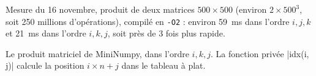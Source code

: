 \begin{importantbox}
Mesure du 16 novembre, produit de deux matrices
$500 \times 500$ (environ $2 \times 500^3$, soit
250 millions d'opérations), compilé en \texttt{-O2} :
environ \qty{59}{\ms} dans l'ordre $i, j, k$ et \qty{21}{\ms} dans
l'ordre $i, k, j$, soit près de 3 fois plus rapide.
\end{importantbox}

\begin{codebox}
Le produit matriciel de MiniNumpy, dans l'ordre
$i, k, j$. La fonction privée \cpp|idx(i, j)|
calcule la position $i \times n + j$ dans le tableau
à plat.
\end{codebox}



\newpage

